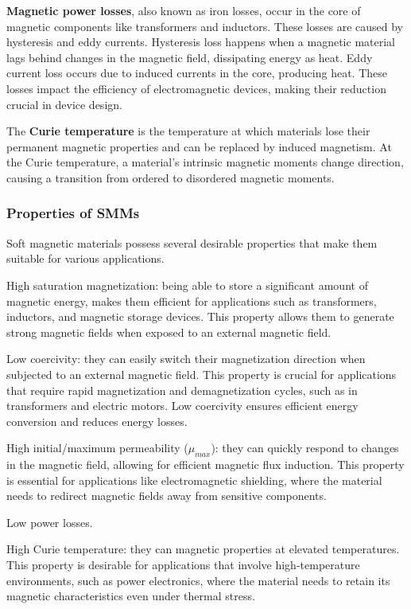 \textbf{Magnetic power losses}, also known as iron losses, occur in the core of magnetic components like transformers and inductors. These losses are caused by hysteresis and eddy currents. Hysteresis loss happens when a magnetic material lags behind changes in the magnetic field, dissipating energy as heat. Eddy current loss occurs due to induced currents in the core, producing heat. These losses impact the efficiency of electromagnetic devices, making their reduction crucial in device design.

The \textbf{Curie temperature} is the temperature at which materials lose their permanent magnetic properties and can be replaced by induced magnetism. At the Curie temperature, a material's intrinsic magnetic moments change direction, causing a transition from ordered to disordered magnetic moments.

\subsubsection{Properties of SMMs}

Soft magnetic materials possess several desirable properties that make them suitable for various applications.

High saturation magnetization: being able to store a significant amount of magnetic energy, makes them efficient for applications such as transformers, inductors, and magnetic storage devices. This property allows them to generate strong magnetic fields when exposed to an external magnetic field.

Low coercivity: they can easily switch their magnetization direction when subjected to an external magnetic field. This property is crucial for applications that require rapid magnetization and demagnetization cycles, such as in transformers and electric motors. Low coercivity ensures efficient energy conversion and reduces energy losses.

High initial/maximum permeability ($\mu_{max}$): they can quickly respond to changes in the magnetic field, allowing for efficient magnetic flux induction. This property is essential for applications like electromagnetic shielding, where the material needs to redirect magnetic fields away from sensitive components.

Low power losses.

High Curie temperature: they can magnetic properties at elevated temperatures. This property is desirable for applications that involve high-temperature environments, such as power electronics, where the material needs to retain its magnetic characteristics even under thermal stress.

